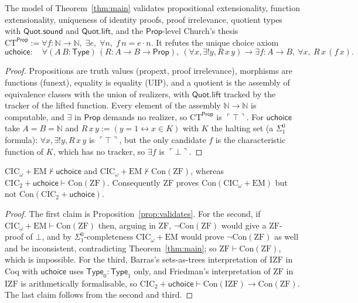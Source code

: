 \documentclass[10pt]{article}
\newcommand{\N}{\mathbb{N}}
\newcommand{\Prop}{\mathsf{Prop}}
\newcommand{\Type}{\mathsf{Type}}
\newcommand{\CIC}{\mathrm{CIC}}
\newcommand{\ZF}{\mathrm{ZF}}
\newcommand{\IZF}{\mathrm{IZF}}
\newcommand{\EM}{\mathrm{EM}}
\newcommand{\Con}{\mathrm{Con}}
\newcommand{\code}[1]{\ulcorner #1\urcorner}
\newcommand{\ap}{\cdot}
\newcommand{\uchoice}{\mathsf{uchoice}}
\newcommand{\CT}{\mathrm{CT}}
\begin{document}
\begin{proposition}\label{prop:validates}
The model of Theorem~\ref{thm:main} validates propositional extensionality,
function extensionality, uniqueness of identity proofs, proof irrelevance,
quotient types with $\mathsf{Quot.sound}$ and $\mathsf{Quot.lift}$, and the
$\Prop$-level Church's thesis
$\CT^\Prop:=\forall f{:}\N\to\N,\;\exists e,\;\forall n,\;f\,n=e\ap n$.
It refutes the unique choice axiom
\[
\uchoice:\quad \forall (A\,B{:}\Type)\,(R{:}A\to B\to\Prop),\
(\forall x,\exists! y,R\,x\,y)\to\exists f{:}A\to B,\ \forall x,\ R\,x\,(f\,x).
\]
\end{proposition}
\begin{proof}
Propositions are truth values (propext, proof irrelevance), morphisms are
functions (funext), equality is equality (UIP), and a quotient is the
assembly of equivalence classes with the union of realizers, with
$\mathsf{Quot.lift}$ tracked by the tracker of the lifted function. Every
element of the assembly $\N\to\N$ is computable, and $\exists$ in $\Prop$
demands no realizer, so $\CT^\Prop$ is $\code\top$. For $\uchoice$ take
$A=B=\N$ and $R\,x\,y:=(y=1\leftrightarrow x\in K)$ with $K$ the halting set
(a $\Sigma^0_1$ formula): $\forall x,\exists!y,R\,x\,y$ is $\code\top$, but
the only candidate $f$ is the characteristic function of $K$, which has no
tracker, so $\exists f$ is $\code\bot$.
\end{proof}

\begin{corollary}\label{cor:boundary}
$\CIC_\omega+\EM\nvdash\uchoice$ and $\CIC_\omega+\EM\nvdash\Con(\ZF)$,
whereas $\CIC_2+\uchoice\vdash\Con(\ZF)$. Consequently $\ZF$ proves
$\Con(\CIC_\omega+\EM)$ but not $\Con(\CIC_2+\uchoice)$.
\end{corollary}
\begin{proof}
The first claim is Proposition~\ref{prop:validates}. For the second, if
$\CIC_\omega+\EM\vdash\Con(\ZF)$ then, arguing in $\ZF$, $\neg\Con(\ZF)$
would give a $\ZF$-proof of $\bot$, and by $\Sigma^0_1$-completeness
$\CIC_\omega+\EM$ would prove $\neg\Con(\ZF)$ as well and be inconsistent,
contradicting Theorem~\ref{thm:main}; so $\ZF\vdash\Con(\ZF)$, which is
impossible. For the third, Barras's sets-as-trees interpretation
\cite{barras10} of $\IZF$ in Coq with $\uchoice$ uses $\Type_0:\Type_1$
only, and Friedman's interpretation of $\ZF$ in $\IZF$ \cite{friedman73}
is arithmetically formalisable, so $\CIC_2+\uchoice\vdash\Con(\IZF)\to
\Con(\ZF)$. The last claim follows from the second and third.
\end{proof}
\end{document}
